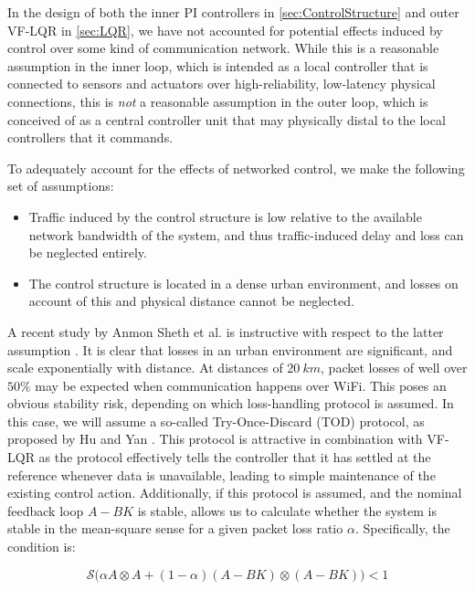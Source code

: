 In the design of both the inner PI controllers in \cref{sec:ControlStructure} and outer VF-LQR in \cref{sec:LQR}, we have not accounted for potential effects induced by control over some kind of communication network. While this is a reasonable assumption in the inner loop, which is intended as a local controller that is connected to sensors and actuators over high-reliability, low-latency physical connections, this is \textit{not} a reasonable assumption in the outer loop, which is conceived of as a central controller unit that may physically distal to the local controllers that it commands.

To adequately account for the effects of networked control, we make the following set of assumptions:

\begin{itemize}
	\item Traffic induced by the control structure is low relative to the available network bandwidth of the system, and thus traffic-induced delay and loss can be neglected entirely.
	\item The control structure is located in a dense urban environment, and losses on account of this and physical distance cannot be neglected.
\end{itemize}

A recent study by Anmon Sheth et al. is instructive with respect to the latter assumption \cite{Sheth2007}. It is clear that losses in an urban environment are significant, and scale exponentially with distance. At distances of $20 \ \si{km}$, packet losses of well over $50\%$ may be expected when communication happens over WiFi. This poses an obvious stability risk, depending on which loss-handling protocol is assumed. In this case, we will assume a so-called Try-Once-Discard (TOD) protocol, as proposed by Hu and Yan \cite{Hu2007}. This protocol is attractive in combination with VF-LQR as the protocol effectively tells the controller that it has settled at the reference whenever data is unavailable, leading to simple maintenance of the existing control action. Additionally, if this protocol is assumed, and the nominal feedback loop $A-BK$ is stable, \cite{Hu2007} allows us to calculate whether the system is stable in the mean-square sense for a given packet loss ratio $\alpha$. Specifically, the condition is:

\begin{equation}\label{eq:HuStabCondition}
	\mathcal{S}\Big(\alpha A \otimes A + (1-\alpha)(A-BK) \otimes (A-BK) \Big) < 1
\end{equation}

